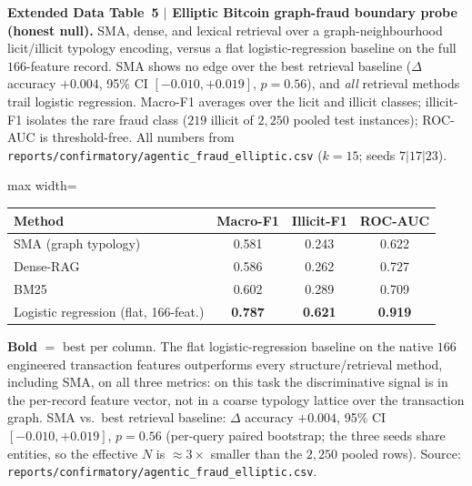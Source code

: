 \documentclass[pdflatex,sn-nature]{sn-jnl}
\newcommand{\edcaption}[1]{\par{\small #1}\par\smallskip}
\begin{document}
\begin{appendices}
\begin{table}[htbp]
\centering
\edcaption{\textbf{Extended Data Table~5 $|$ Elliptic Bitcoin graph-fraud boundary
    probe (honest null).}
  SMA, dense, and lexical retrieval over a graph-neighbourhood licit/illicit
  typology encoding, versus a flat logistic-regression baseline on the full
  $166$-feature record. SMA shows no edge over the best retrieval baseline
  ($\Delta$ accuracy $+0.004$, 95\% CI $[-0.010,+0.019]$, $p{=}0.56$), and
  \emph{all} retrieval methods trail logistic regression. Macro-F1 averages over
  the licit and illicit classes; illicit-F1 isolates the rare fraud class
  ($219$ illicit of $2{,}250$ pooled test instances); ROC-AUC is threshold-free.
  All numbers from \texttt{reports/confirmatory/agentic\_fraud\_elliptic.csv}
  ($k{=}15$; seeds $7|17|23$).}
\small
\setlength{\tabcolsep}{8pt}
\begin{adjustbox}{max width=\textwidth}\begin{tabular}{lccc}
\toprule
\textbf{Method} & \textbf{Macro-F1} & \textbf{Illicit-F1} & \textbf{ROC-AUC} \\
\midrule
SMA (graph typology)        & 0.581 & 0.243 & 0.622 \\
Dense-RAG                   & 0.586 & 0.262 & 0.727 \\
BM25                        & 0.602 & 0.289 & 0.709 \\
\midrule
Logistic regression (flat, 166-feat.) & \textbf{0.787} & \textbf{0.621} & \textbf{0.919} \\
\bottomrule
\end{tabular}\end{adjustbox}
\begin{flushleft}
{\footnotesize
\textbf{Bold} $=$ best per column. The flat logistic-regression baseline on the
native $166$ engineered transaction features outperforms every
structure/retrieval method, including SMA, on all three metrics: on this task the
discriminative signal is in the per-record feature vector, not in a coarse
typology lattice over the transaction graph. SMA vs.\ best retrieval baseline:
$\Delta$ accuracy $+0.004$, 95\% CI $[-0.010,+0.019]$, $p{=}0.56$
(per-query paired bootstrap; the three seeds share entities, so the effective $N$
is $\approx 3\times$ smaller than the $2{,}250$ pooled rows).
Source: \texttt{reports/confirmatory/agentic\_fraud\_elliptic.csv}.}
\end{flushleft}
\label{tab:ed5_elliptic}
\end{table}




\end{appendices}
\end{document}
